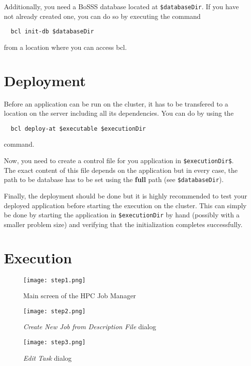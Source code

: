 \documentclass[11pt,twoside,a4paper]{fdyartcl}
\theoremstyle{myPlain}
\theoremstyle{myDefinition}
\begin{document}
Additionally, you need a BoSSS database located at \verb|$databaseDir|. If you
have not already created one, you can do so by executing the command
\begin{verbatim}
  bcl init-db $databaseDir
\end{verbatim}
from a location where you can access bcl.


\section{Deployment}

Before an application can be run on the cluster, it has to be transfered to a location on the server including all its dependencies. You can do by using the
\begin{verbatim}
  bcl deploy-at $executable $executionDir
\end{verbatim}
command.

Now, you need to create a control file for you application in
\verb|$executionDir$|. The exact content of this file depends on the
application but in every case, the path to be database has to be set using the
\textbf{full} path (see \verb|$databaseDir|).

Finally, the deployment should be done but it is highly recommended to test 
your deployed application before starting the execution on the cluster. This 
can simply be done by starting the application in \verb|$executionDir| by hand
(possibly with a smaller problem size) and verifying that the initialization 
completes successfully.


\section{Execution}

\begin{figure}
	\centering
  \texttt{[image: step1.png]}%
  \caption{Main screen of the HPC Job Manager}%
  \label{fig:step1}%
\end{figure}

\begin{figure}
	\centering
  \texttt{[image: step2.png]}%
  \caption{\emph{Create New Job from Description File} dialog}%
  \label{fig:step2}%
\end{figure}

\begin{figure}
	\centering
  \texttt{[image: step3.png]}%
  \caption{\emph{Edit Task} dialog}%
  \label{fig:step3}%
\end{figure}
\end{document}
